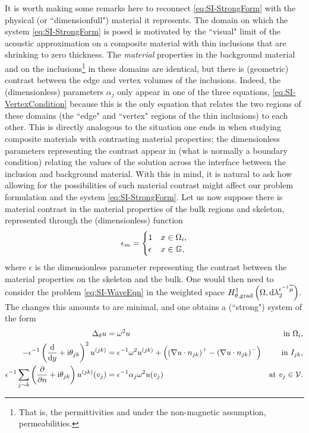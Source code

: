 It is worth making some remarks here to reconnect \eqref{eq:SI-StrongForm} with the physical (or ``dimensionfull") material it represents.
The domain on which the system \eqref{eq:SI-StrongForm} is posed is motivated by the ``visual" limit of the acoustic approximation on a composite material with thin inclusions that are shrinking to zero thickness.
The \emph{material} properties in the background material and on the inclusions\footnote{That is, the permittivities and under the non-magnetic assumption, permeabilities.} in these domains are identical, but there is (geometric) contrast between the edge and vertex volumes of the inclusions.
Indeed, the (dimensionless) parameters $\alpha_j$ only appear in one of the three equations, \eqref{eq:SI-VertexCondition} because this is the only equation that relates the two regions of these domains (the ``edge" and ``vertex" regions of the thin inclusions) to each other.
This is directly analogous to the situation one ends in when studying composite materials with contrasting material properties; the dimensionless parameters representing the contrast appear in (what is normally a boundary condition) relating the values of the solution across the interface between the inclusion and background material.
With this in mind, it is natural to ask how allowing for the possibilities of such material contrast might affect our problem formulation and the system \eqref{eq:SI-StrongForm}.
Let us now suppose there is material contrast in the material properties of the bulk regions and skeleton, represented through the (dimensionless) function
\begin{align*}
	\epsilon_m =
	\begin{cases} 1 & x\in\Omega_i, \\ \epsilon & x\in\mathbb{G}, \end{cases}
\end{align*}
where $\epsilon$ is the dimensionless parameter representing the contrast between the material properties on the skeleton and the bulk.
One would then need to consider the problem \eqref{eq:SI-WaveEqn} in the weighted space $H^1_{\theta, \mathrm{grad}}\left( \Omega, \mathrm{d}\lambda_2^{\epsilon^{-1}\widetilde{\mu}} \right)$. 
The changes this amounts to are minimal, and one obtains a (``strong") system of the form 
\begin{subequations}
	\begin{align*}
		\Delta_\theta u 
		&= \omega^2 u 
		&\text{in } \Omega_i, \\
		- \epsilon^{-1}\left( \dfrac{\mathrm{d}}{\mathrm{d}y} + \mathrm{i}\theta_{jk} \right)^2u^{(jk)}  
		&= \epsilon^{-1}\omega^2 u^{(jk)} + \left( \left( \nabla u\cdot n_{jk} \right)^+ - \left( \nabla u\cdot n_{jk} \right)^- \right)
		&\text{in } I_{jk}, \\
		\epsilon^{-1}\sum_{j\sim k} \left( \dfrac{\partial }{\partial n}+\mathrm{i}\theta_{jk} \right) u^{(jk)}(v_j) 
		&= \epsilon^{-1}\alpha_j\omega^2 u(v_j)
		&\text{at } v_j\in\mathcal{V}.
	\end{align*}
\end{subequations}
